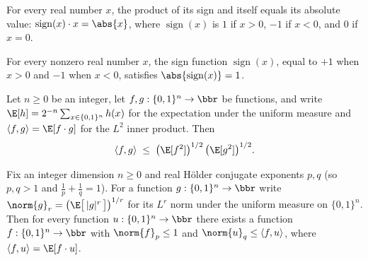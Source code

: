 \begin{lemma}
\leanok
{}
\label{BooleanAnalysis.Hypercontractivity.sign_mul_self}
For every real number $x$, the product of its sign and itself equals its absolute value:
$\operatorname{sign}(x)\cdot x = \abs{x}$, where $\operatorname{sign}(x)$ is $1$ if
$x>0$, $-1$ if $x<0$, and $0$ if $x=0$.
\end{lemma}

\begin{lemma}
\leanok
{}
\label{BooleanAnalysis.Hypercontractivity.abs_sign_eq_one}
For every nonzero real number $x$, the sign function $\operatorname{sign}(x)$, equal to
$+1$ when $x > 0$ and $-1$ when $x < 0$, satisfies $\abs{\operatorname{sign}(x)} = 1$.
\end{lemma}

\begin{lemma}
\leanok
{}
\label{BooleanAnalysis.Hypercontractivity.cauchy_schwarz_bool}
Let $n\ge0$ be an integer, let $f, g : \{0,1\}^n \to \bbr$ be functions, and write
$\E[h] = 2^{-n}\sum_{x
\in \{0,1\}^n} h(x)$ for the expectation under the uniform measure and $\langle f,
g\rangle = \E[f\cdot g]$ for the $L^2$ inner product. Then
\[
  \langle f, g\rangle \;\le\; \big(\E[f^2]\big)^{1/2}\,\big(\E[g^2]\big)^{1/2}.
\]
\end{lemma}

\begin{lemma}
\leanok
{}
\label{BooleanAnalysis.Hypercontractivity.holder_sharpness}
Fix an integer dimension $n\ge0$ and real Hölder conjugate exponents $p, q$ (so $p, q >
1$ and $\tfrac1p +
\tfrac1q = 1$). For a function $g : \{0,1\}^n \to \bbr$ write $\norm{g}_r =
\bigl(\E\bigl[\,|g|^r\,\bigr]\bigr)^{1/r}$ for its $L^r$ norm under the uniform measure
on $\{0,1\}^n$. Then for every function $u : \{0,1\}^n \to \bbr$ there exists a function
$f : \{0,1\}^n \to \bbr$ with $\norm{f}_p \le 1$ and $\norm{u}_q \le \langle f,
u\rangle$, where $\langle f, u\rangle = \E[f\cdot u]$.
\end{lemma}

